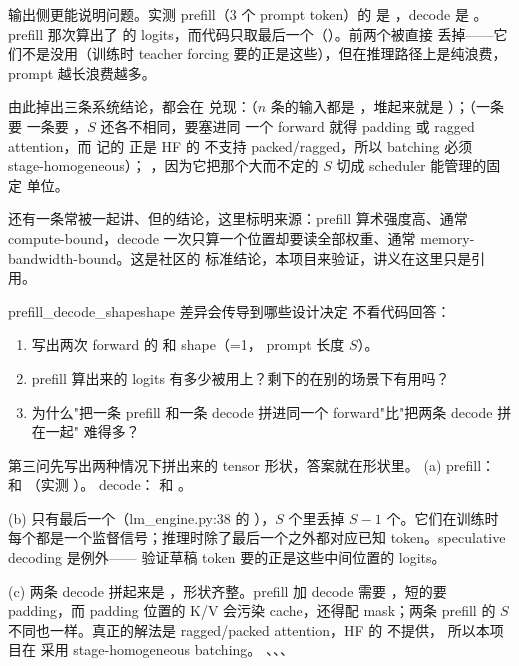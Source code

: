 输出侧更能说明问题。实测 prefill（3 个 prompt token）的  是
\code{[1, 3, 50257]}，decode 是 \code{[1, 1, 50257]}。prefill 那次算出了
的 logits，而代码只取最后一个（）。前两个被直接
丢掉——它们不是没用（训练时 teacher forcing 要的正是这些），但在推理路径上是纯浪费，prompt
越长浪费越多。

由此掉出三条系统结论，都会在  兑现：（$n$ 条的输入都是 \code{[1,1]}，堆起来就是 \code{[n,1]}）；（一条要 \code{[1,S]} 一条要 \code{[1,1]}，$S$ 还各不相同，要塞进同
一个 forward 就得 padding 或 ragged attention，而  记的
正是 HF 的  不支持 packed/ragged，所以 batching 必须 stage-homogeneous）；
，因为它把那个大而不定的 $S$ 切成 scheduler 能管理的固定
单位。

还有一条常被一起讲、但的结论，这里标明来源：prefill 算术强度高、通常
compute-bound，decode 一次只算一个位置却要读全部权重、通常 memory-bandwidth-bound。这是社区的
标准结论，本项目来验证，讲义在这里只是引用。

\begin{checkpoint}{prefill_decode_shape}{shape 差异会传导到哪些设计决定}
不看代码回答：
\begin{enumerate}[label=(\alph*)]
  \item 写出两次 forward 的  和  shape（=1，
        prompt 长度 $S$）。
  \item prefill 算出来的 logits 有多少被用上？剩下的在别的场景下有用吗？
  \item 为什么"把一条 prefill 和一条 decode 拼进同一个 forward"比"把两条 decode 拼在一起"
        难得多？
\end{enumerate}
\hint 第三问先写出两种情况下拼出来的 tensor 形状，答案就在形状里。
\ifshowanswers
\tcblower
\answer (a) prefill：\codet{[1, S]} 和 \codet{[1, S, vocab]}（实测 \codet{[1, 3, 50257]}）。
decode：\codet{[1, 1]} 和 \codet{[1, 1, vocab]}。

(b) 只有最后一个（lm\_engine.py:38 的 \codet{[:, -1, :]}），$S$ 个里丢掉 $S-1$ 个。它们在训练时
每个都是一个监督信号；推理时除了最后一个之外都对应已知 token。speculative decoding 是例外——
验证草稿 token 要的正是这些中间位置的 logits。

(c) 两条 decode 拼起来是 \codet{[2, 1]}，形状齐整。prefill 加 decode 需要
\codet{[2, max(S, 1)]}，短的要 padding，而 padding 位置的 K/V 会污染 cache，还得配 mask；两条
prefill 的 $S$ 不同也一样。真正的解法是 ragged/packed attention，HF 的  不提供，
所以本项目在  采用 stage-homogeneous batching。
\whereincode {}、、、
\fi
\end{checkpoint}

